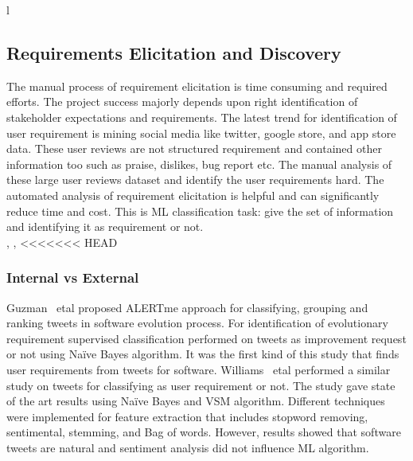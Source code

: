 l\subsection{Requirements Elicitation and Discovery} The manual process of
requirement elicitation is time consuming and required efforts. The project
success majorly depends upon right identification of stakeholder expectations
and requirements. The latest trend for identification of user requirement is
mining social media like twitter, google store, and app store data. These user
reviews are not structured requirement and contained other information too such
as praise, dislikes, bug report etc. The manual analysis of these large user
reviews dataset and identify the user requirements hard. The automated analysis
of requirement elicitation is helpful and can significantly reduce time and
cost. This is ML classification task: give the set of information and
identifying it as requirement or not.\\

\cite{Cleland-Huang:2008}, \cite{Kaiya:2010}, \cite{Castro-Herrera:2009}
<<<<<<< HEAD
\subsubsection{Internal vs External}
Guzman ~etal \cite{Guzman:2017} proposed ALERTme approach for classifying, grouping and ranking tweets in software evolution process. For identification of evolutionary requirement supervised classification performed on tweets as improvement request or not using Naïve Bayes algorithm. It was the first kind of this study that finds user requirements from tweets for software. Williams ~etal \cite{Williams:2017} performed a similar study on tweets for classifying as user requirement or not. The study gave state of the art results using Naïve Bayes and VSM algorithm. Different techniques were implemented for feature extraction that includes stopword removing, sentimental, stemming, and Bag of words. However, results showed that software tweets are natural and sentiment analysis did not influence ML algorithm.\\

